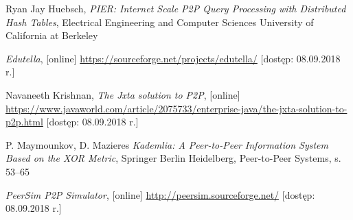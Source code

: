 \documentclass[12pt, twoside, openany]{report}
\begin{document}
\begin{thebibliography}{11}
 Ryan Jay Huebsch, \emph{PIER: Internet Scale P2P Query Processing with Distributed Hash Tables}, Electrical Engineering and Computer Sciences University of California at Berkeley

 \emph{Edutella}, [online] \url{https://sourceforge.net/projects/edutella/} [dostęp: 08.09.2018 r.]

 Navaneeth Krishnan, \emph{The Jxta solution to P2P}, [online] \url{https://www.javaworld.com/article/2075733/enterprise-java/the-jxta-solution-to-p2p.html} [dostęp: 08.09.2018 r.]

 P. Maymounkov, D. Mazieres \emph{Kademlia: A Peer-to-Peer Information System Based on the XOR Metric}, Springer Berlin Heidelberg, Peer-to-Peer Systems, s. 53--65

 \emph{PeerSim P2P Simulator}, [online] \url{http://peersim.sourceforge.net/} [dostęp: 08.09.2018 r.]


\end{thebibliography}
\end{document}
